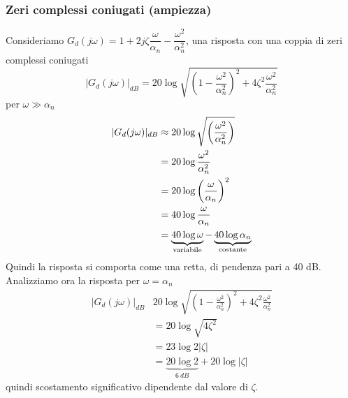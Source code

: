 \documentclass{article}
\numberwithin{equation}{subsection}
\begin{document}
\subsubsection{Zeri complessi coniugati (ampiezza)}
Consideriamo $G_d(j\omega) = 1+ 2j \zeta \dfrac{\omega}{\alpha_n} - \dfrac{\omega^2}{\alpha_n^2}$, una risposta con una coppia di zeri complessi coniugati
\[
    |G_d(j\omega)|_{dB} = 20 \log \sqrt{\left(1 - \frac{\omega^2}{\alpha_n^2}\right)^2 + 4 \zeta^2 \frac{\omega^2}{\alpha_n^2}}
\]
per $\omega \gg \alpha_n$
\begin{align*}
    |G_d(j\omega)|_{dB} &\approx 20 \log \sqrt{\left(\frac{\omega^2}{\alpha_n^2}\right)}\\
    &=20 \log \frac{\omega^2}{\alpha_n^2}\\
    &= 20 \log \left(\frac{\omega}{\alpha_n}\right)^2\\
    &= 40 \log \frac{\omega}{\alpha_n}\\
    &= \underbrace{40 \log \omega}_{\text{variabile}} - \underbrace{40 \log \alpha_n}_{\text{costante}}
\end{align*}
Quindi la risposta si comporta come una retta, di pendenza pari a 40 dB.\\
Analizziamo ora la risposta per $\omega = \alpha_n$
\begin{align*}
    |G_d(j\omega)|_{dB} &20 \log \sqrt{\left(1 - \frac{\omega^2}{\alpha_n^2}\right)^2 + 4 \zeta^2 \frac{\omega^2}{\alpha_n^2}}\\
    &= 20 \log \sqrt{4 \zeta^2}\\
    &= 23 \log 2|\zeta|\\
    &= \underbrace{20\log 2 }_{6 \ dB} +20 \log |\zeta|
\end{align*}
quindi scostamento significativo dipendente dal valore di $\zeta$.
\end{document}

